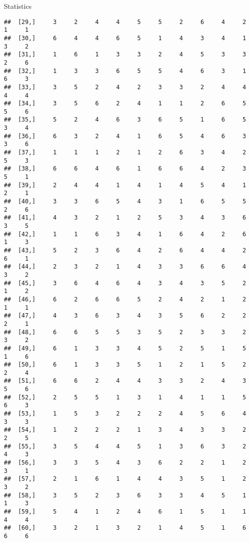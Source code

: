 \documentclass[
  ignorenonframetext,
]{beamer}
\begin{document}
\begin{frame}[fragile]{Statistics}
\begin{verbatim}
##  [29,]     3     2     4     4     5     5     2     6     4     2     1     1
##  [30,]     6     4     4     6     5     1     4     3     4     1     3     2
##  [31,]     1     6     1     3     3     2     4     5     3     3     2     6
##  [32,]     1     3     3     6     5     5     4     6     3     1     6     3
##  [33,]     3     5     2     4     2     3     3     2     4     4     4     4
##  [34,]     3     5     6     2     4     1     1     2     6     5     5     6
##  [35,]     5     2     4     6     3     6     5     1     6     5     3     4
##  [36,]     6     3     2     4     1     6     5     4     6     3     3     6
##  [37,]     1     1     1     2     1     2     6     3     4     2     5     3
##  [38,]     6     6     4     6     1     6     6     4     2     3     5     1
##  [39,]     2     4     4     1     4     1     4     5     4     1     2     1
##  [40,]     3     3     6     5     4     3     1     6     5     5     2     6
##  [41,]     4     3     2     1     2     5     3     4     3     6     3     5
##  [42,]     1     1     6     3     4     1     6     4     2     6     1     3
##  [43,]     5     2     3     6     4     2     6     4     4     2     6     1
##  [44,]     2     3     2     1     4     3     3     6     6     4     3     2
##  [45,]     3     6     4     6     4     3     4     3     5     2     1     2
##  [46,]     6     2     6     6     5     2     4     2     1     2     1     1
##  [47,]     4     3     6     3     4     3     5     6     2     2     2     1
##  [48,]     6     6     5     5     3     5     2     3     3     2     3     2
##  [49,]     6     1     3     3     4     5     2     5     1     5     1     6
##  [50,]     6     1     3     3     5     1     2     1     5     2     2     4
##  [51,]     6     6     2     4     4     3     3     2     4     3     5     6
##  [52,]     2     5     5     1     3     1     4     1     1     5     6     3
##  [53,]     1     5     3     2     2     2     4     5     6     4     3     3
##  [54,]     1     2     2     2     1     3     4     3     3     2     2     5
##  [55,]     3     5     4     4     5     1     3     6     3     2     4     3
##  [56,]     3     3     5     4     3     6     2     2     1     2     3     1
##  [57,]     2     1     6     1     4     4     3     5     1     2     3     2
##  [58,]     3     5     2     3     6     3     3     4     5     1     1     3
##  [59,]     5     4     1     2     4     6     1     5     1     1     4     4
##  [60,]     3     2     1     3     2     1     4     5     1     6     6     6

\end{verbatim}
\end{frame}
\end{document}
